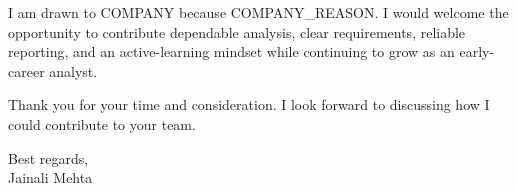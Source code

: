 \documentclass[letterpaper,11pt]{article}
\begin{document}
\bigbreak
I am drawn to {{COMPANY}} because {{COMPANY_REASON}}. I would welcome the opportunity to contribute dependable analysis, clear requirements, reliable reporting, and an active-learning mindset while continuing to grow as an early-career analyst.

\bigbreak
Thank you for your time and consideration. I look forward to discussing how I could contribute to your team.

\bigbreak
Best regards,\\
Jainali Mehta
\end{document}
